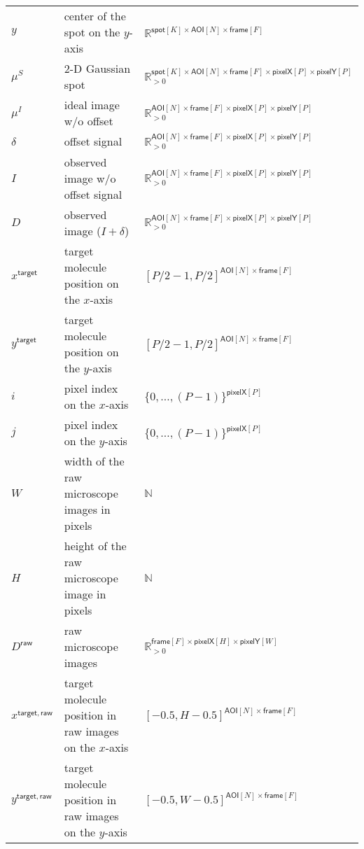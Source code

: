 \begin{table}
\begin{tabular}{l l l}
$y$ & center of the spot on the $y$-axis & $\mathbb{R}^{\mathsf{spot}[K] \times \mathsf{AOI}[N] \times \mathsf{frame}[F]}$ \rule{0pt}{3ex} \\
$\mu^S$ & 2-D Gaussian spot & $\mathbb{R}_{>0}^{\mathsf{spot}[K] \times \mathsf{AOI}[N] \times \mathsf{frame}[F] \times \mathsf{pixelX}[P] \times \mathsf{pixelY}[P]}$ \rule{0pt}{3ex} \\
$\mu^I$ & ideal image w/o offset & $\mathbb{R}_{>0}^{\mathsf{AOI}[N] \times \mathsf{frame}[F] \times \mathsf{pixelX}[P] \times \mathsf{pixelY}[P]}$ \rule{0pt}{3ex} \\
$\delta$ & offset signal & $\mathbb{R}_{>0}^{\mathsf{AOI}[N] \times \mathsf{frame}[F] \times \mathsf{pixelX}[P] \times \mathsf{pixelY}[P]}$ \rule{0pt}{3ex} \\
$I$ & observed image w/o offset signal & $\mathbb{R}_{>0}^{\mathsf{AOI}[N] \times \mathsf{frame}[F] \times \mathsf{pixelX}[P] \times \mathsf{pixelY}[P]}$ \rule{0pt}{3ex} \\
$D$ & observed image ($I + \delta$) & $\mathbb{R}_{>0}^{\mathsf{AOI}[N] \times \mathsf{frame}[F] \times \mathsf{pixelX}[P] \times \mathsf{pixelY}[P]}$ \rule{0pt}{3ex} \\
$x^\mathsf{target}$ & target molecule position on the $x$-axis & $[P/2-1, P/2]^{\mathsf{AOI}[N] \times \mathsf{frame}[F]}$ \rule{0pt}{3ex} \\
$y^\mathsf{target}$ & target molecule position on the $y$-axis & $[P/2-1, P/2]^{\mathsf{AOI}[N] \times \mathsf{frame}[F]}$ \rule{0pt}{3ex} \\
$i$ & pixel index on the $x$-axis & $\{0, \dots, (P-1)\}^{\mathsf{pixelX}[P]}$ \rule{0pt}{3ex} \\
$j$ & pixel index on the $y$-axis & $\{0, \dots, (P-1)\}^{\mathsf{pixelX}[P]}$ \rule{0pt}{3ex} \\
$W$ & width of the raw microscope images in pixels & $\mathbb{N}$ \rule{0pt}{3ex} \\
$H$ & height of the raw microscope image in pixels & $\mathbb{N}$ \rule{0pt}{3ex} \\
$D^\mathsf{raw}$ & raw microscope images & $\mathbb{R}_{>0}^{\mathsf{frame}[F] \times \mathsf{pixelX}[H] \times \mathsf{pixelY}[W]}$ \rule{0pt}{3ex} \\
$x^{\mathsf{target}, \mathsf{raw}}$ & target molecule position in raw images on the $x$-axis & $[-0.5, H-0.5]^{\mathsf{AOI}[N] \times \mathsf{frame}[F]}$ \rule{0pt}{3ex} \\
$y^{\mathsf{target}, \mathsf{raw}}$ & target molecule position in raw images on the $y$-axis & $[-0.5, W-0.5]^{\mathsf{AOI}[N] \times \mathsf{frame}[F]}$ \rule{0pt}{3ex} \\
\bottomrule
\end{tabular}
\end{table}